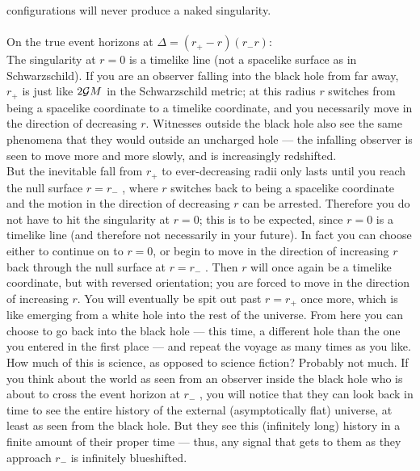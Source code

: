 configurations will never produce a naked singularity.
\\
\\
On the true event horizons at $\Delta = (r_+ -r)(r_-r)$:\\
The singularity at $r = 0$ is a timelike line (not
a spacelike surface as in Schwarzschild). If you are an observer falling into the black hole
from far away, $r_+$ is just like $2\mathcal{G} M$ in the Schwarzschild metric; at this radius $r$ switches
from being a spacelike coordinate to a timelike coordinate, and you necessarily move in the
direction of decreasing $r$. Witnesses outside the black hole also see the same phenomena
that they would outside an uncharged hole — the infalling observer is seen to move more
and more slowly, and is increasingly redshifted.\\
But the inevitable fall from $r_+$ to ever-decreasing radii only lasts until you reach the null
surface $r = r_−$ , where $r$ switches back to being a spacelike coordinate and the motion in the
direction of decreasing $r$ can be arrested. Therefore you do not have to hit the singularity
at $r = 0$; this is to be expected, since $r = 0$ is a timelike line (and therefore not necessarily
in your future). In fact you can choose either to continue on to $r = 0$, or begin to move
in the direction of increasing $r$ back through the null surface at $r = r_−$ . Then $r$ will once
again be a timelike coordinate, but with reversed orientation; you are forced to move in the
direction of increasing $r$. You will eventually be spit out past $r = r_+$ once more, which is
like emerging from a white hole into the rest of the universe. From here you can choose to
go back into the black hole — this time, a different hole than the one you entered in the
first place — and repeat the voyage as many times as you like.\\
How much of this is science, as opposed to science fiction? Probably not much. If you
think about the world as seen from an observer inside the black hole who is about to cross the
event horizon at $r_−$ , you will notice that they can look back in time to see the entire history
of the external (asymptotically flat) universe, at least as seen from the black hole. But they
see this (infinitely long) history in a finite amount of their proper time — thus, any signal
that gets to them as they approach $r_−$ is infinitely blueshifted.

